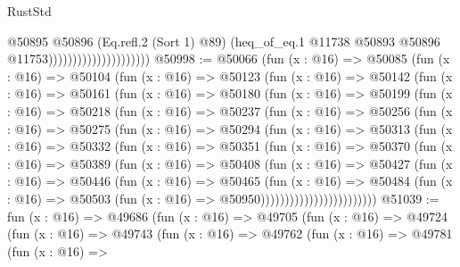 \begin{lexlean}{RustStd}
\begin{coremodule}
                                          @50895
                                            @50896
                                            (Eq.refl.{2} (Sort 1) @89)
                                            (heq_of_eq.{1}
                                              @11738
                                              @50893
                                              @50896
                                              @11753)))))))))))))))))))))
@50998 := @50066
    (fun (x : @16) =>
    @50085
      (fun (x : @16) =>
      @50104
        (fun (x : @16) =>
        @50123
          (fun (x : @16) =>
          @50142
            (fun (x : @16) =>
            @50161
              (fun (x : @16) =>
              @50180
                (fun (x : @16) =>
                @50199
                  (fun (x : @16) =>
                  @50218
                    (fun (x : @16) =>
                    @50237
                      (fun (x : @16) =>
                      @50256
                        (fun (x : @16) =>
                        @50275
                          (fun (x : @16) =>
                          @50294
                            (fun (x : @16) =>
                            @50313
                              (fun (x : @16) =>
                              @50332
                                (fun (x : @16) =>
                                @50351
                                  (fun (x : @16) =>
                                  @50370
                                    (fun (x : @16) =>
                                    @50389
                                      (fun (x : @16) =>
                                      @50408
                                        (fun (x : @16) =>
                                        @50427
                                          (fun (x : @16) =>
                                          @50446
                                            (fun (x : @16) =>
                                            @50465
                                              (fun (x : @16) =>
                                              @50484
                                                (fun (x : @16) =>
                                                @50503
                                                  (fun (x : @16) => @50950))))))))))))))))))))))))
@51039 := fun (x : @16) =>
  @49686
    (fun (x : @16) =>
    @49705
      (fun (x : @16) =>
      @49724
        (fun (x : @16) =>
        @49743
          (fun (x : @16) =>
          @49762
            (fun (x : @16) =>
            @49781
              (fun (x : @16) =>

\end{coremodule}
\end{lexlean}
